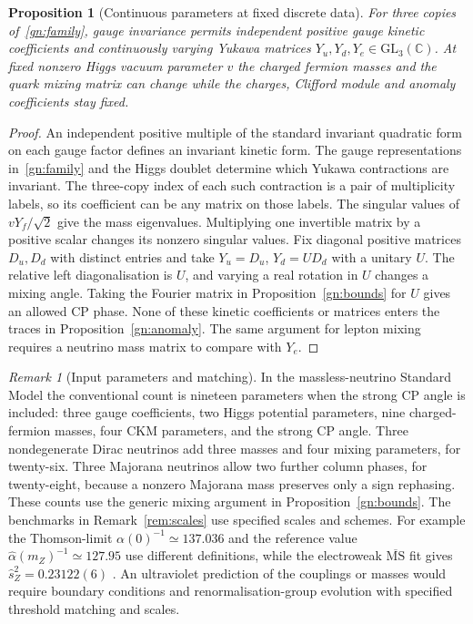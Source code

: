 \documentclass[aps,pra,onecolumn,superscriptaddress,nofootinbib,10pt]{revtex4-2}
\newtheorem{proposition}[theorem]{Proposition}
\theoremstyle{definition}
\theoremstyle{remark}
\newtheorem{remark}[theorem]{Remark}
\begin{document}
\begin{proposition}[Continuous parameters at fixed discrete data]\label{gn:continuous}
For three copies of~\eqref{gn:family}, gauge invariance permits
independent positive gauge kinetic coefficients and continuously
varying Yukawa matrices $Y_u,Y_d,Y_e\in\mathrm{GL}_3(\mathbb C)$.
At fixed nonzero Higgs vacuum parameter $v$ the charged fermion
masses and the quark mixing matrix can change while the charges,
Clifford module and anomaly coefficients stay fixed.
\end{proposition}
\begin{proof}
An independent positive multiple of the standard invariant
quadratic form on each gauge factor defines an invariant kinetic
form. The gauge representations in~\eqref{gn:family} and the Higgs
doublet determine which Yukawa contractions are invariant. The
three-copy index of each such contraction is a pair of multiplicity
labels, so its coefficient can be any matrix on those labels.
The singular values of $vY_f/\sqrt2$ give the mass eigenvalues.
Multiplying one invertible matrix by a positive scalar changes its
nonzero singular values. Fix diagonal positive matrices $D_u,D_d$
with distinct entries and take $Y_u=D_u$, $Y_d=U D_d$ with a unitary
$U$. The relative left diagonalisation is $U$, and varying a real
rotation in $U$ changes a mixing angle. Taking the Fourier matrix in
Proposition~\ref{gn:bounds} for $U$ gives an allowed CP phase.
None of these kinetic coefficients or matrices enters the traces
in Proposition~\ref{gn:anomaly}. The same argument for lepton
mixing requires a neutrino mass matrix to compare with $Y_e$.
\end{proof}

\begin{remark}[Input parameters and matching]\label{gn:running}
In the massless-neutrino Standard Model the conventional count
is nineteen parameters when the strong CP angle is included:
three gauge coefficients, two Higgs potential parameters,
nine charged-fermion masses, four CKM parameters, and the
strong CP angle. Three nondegenerate Dirac neutrinos add three
masses and four mixing parameters, for twenty-six. Three
Majorana neutrinos allow two further column phases, for
twenty-eight, because a nonzero Majorana mass preserves only a
sign rephasing. These counts use the generic mixing argument in
Proposition~\ref{gn:bounds}. The benchmarks in
Remark~\ref{rem:scales} use specified scales and schemes. For
example the Thomson-limit $\alpha(0)^{-1}\simeq137.036$ and the
reference value $\widehat\alpha(m_Z)^{-1}\simeq127.95$ use different
definitions, while the electroweak $\overline{\mathrm{MS}}$ fit
gives $\hat s_Z^2=0.23122(6)$ \cite{ex-PDG26,PDG}. An ultraviolet
prediction of the couplings or masses would require boundary
conditions and renormalisation-group evolution with specified
threshold matching and scales.
\end{remark}
\end{document}
